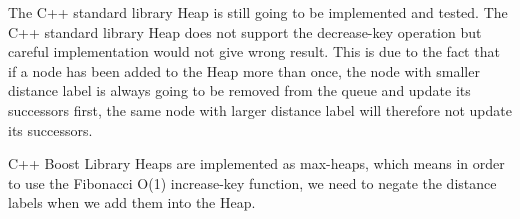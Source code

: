 The C++ standard library Heap is still going to be implemented and tested.
The C++ standard library Heap does not support the decrease-key operation but
careful implementation would not give wrong result.
This is due to the fact that if a node has been added to the Heap more than once,
the node with smaller distance label is always going to be removed from the queue and update its successors first,
the same node with larger distance label will therefore not update its successors.


C++ Boost Library Heaps are implemented as max-heaps,
which means in order to use the Fibonacci O(1) increase-key function,
we need to negate the distance labels when we add them into the Heap.

\begin{comment}
\section{Memory Management}
Memory management is important in programming which speeds up programs to run faster.
It is well know that random memory access is slow compared to CPU cache memory access due to the fact CPU cache stores copies of data from RAM to speed up latency of RAM access, in other words, we want to keep data in the cache for as long as possible.
Common techniques such as using smaller data types,
organize data to avoid big spread of data,
access adjacent memory address in a loop.

In our program,
we use boost::dynamic\_bitset in te Heap implementations to keep track of boolean variables for indicating whether a node is labelled or not.
\todo{haven't implemented this, but will be}
A bitset container is designed to store boolean values where each
element uses only 1 bit memory,
which greatly reduces memory usage.

We use memset from the C library  to reset values to 0 for example resetting all distance labels.
\todo{also haven't implemented}
The memset function call is better than a simple for loop because this function is optimised to reset values faster,
it is given a argument of the size of the memory to clear,
the complier is able to generate optimised code to clear memory depending on its size, using techniques such as loop unrolling.
\todo[inline]{Code generation of block move (memcpy) and block set (memset) was rewritten. GCC can now pick the best algorithm (loop, unrolled loop, instruction with rep prefix or a library call) based on the size of the block being copied and the CPU being optimized for.  - \url{http://gcc.gnu.org/gcc-4.3/changes.html}}

\todo[inline]{talk about using the OOP factory pattern to provide different shortest path algorithms to the TA solver in run time instead of compile time?}
\todo[inline]{talk about using C++ template to give a generic algorithm for the Boost Heaps? So instead of writing 6 similar algorithms we just write a generic one.}
\end{comment}
